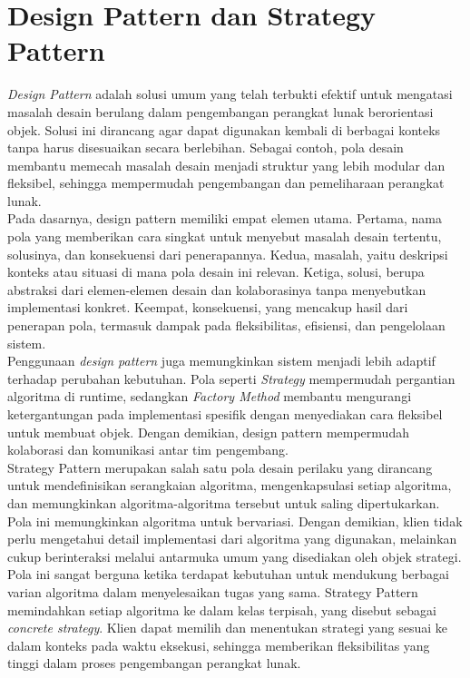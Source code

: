 \section{Design Pattern dan Strategy Pattern ~\cite{Gamma:94:design}}
\label{sec:designdanstrategypattern}
\textit{Design Pattern} adalah solusi umum yang telah terbukti efektif untuk mengatasi masalah desain berulang dalam pengembangan perangkat lunak berorientasi objek. Solusi ini dirancang agar dapat digunakan kembali di berbagai konteks tanpa harus disesuaikan secara berlebihan. Sebagai contoh, pola desain membantu memecah masalah desain menjadi struktur yang lebih modular dan fleksibel, sehingga mempermudah pengembangan dan pemeliharaan perangkat lunak.
\\
Pada dasarnya, design pattern memiliki empat elemen utama. Pertama, nama pola yang memberikan cara singkat untuk menyebut masalah desain tertentu, solusinya, dan konsekuensi dari penerapannya. Kedua, masalah, yaitu deskripsi konteks atau situasi di mana pola desain ini relevan. Ketiga, solusi, berupa abstraksi dari elemen-elemen desain dan kolaborasinya tanpa menyebutkan implementasi konkret. Keempat, konsekuensi, yang mencakup hasil dari penerapan pola, termasuk dampak pada fleksibilitas, efisiensi, dan pengelolaan sistem.
\\
Penggunaan \textit{design pattern} juga memungkinkan sistem menjadi lebih adaptif terhadap perubahan kebutuhan. Pola seperti \textit{Strategy} mempermudah pergantian algoritma di runtime, sedangkan \textit{Factory Method} membantu mengurangi ketergantungan pada implementasi spesifik dengan menyediakan cara fleksibel untuk membuat objek. Dengan demikian, design pattern mempermudah kolaborasi dan komunikasi antar tim pengembang.
\\
Strategy Pattern merupakan salah satu pola desain perilaku yang dirancang untuk mendefinisikan serangkaian algoritma, mengenkapsulasi setiap algoritma, dan memungkinkan algoritma-algoritma tersebut untuk saling dipertukarkan. Pola ini memungkinkan algoritma untuk bervariasi. Dengan demikian, klien tidak perlu mengetahui detail implementasi dari algoritma yang digunakan, melainkan cukup berinteraksi melalui antarmuka umum yang disediakan oleh objek strategi.
\\
Pola ini sangat berguna ketika terdapat kebutuhan untuk mendukung berbagai varian algoritma dalam menyelesaikan tugas yang sama. Strategy Pattern memindahkan setiap algoritma ke dalam kelas terpisah, yang disebut sebagai \textit{concrete strategy}. Klien dapat memilih dan menentukan strategi yang sesuai ke dalam konteks pada waktu eksekusi, sehingga memberikan fleksibilitas yang tinggi dalam proses pengembangan perangkat lunak.
